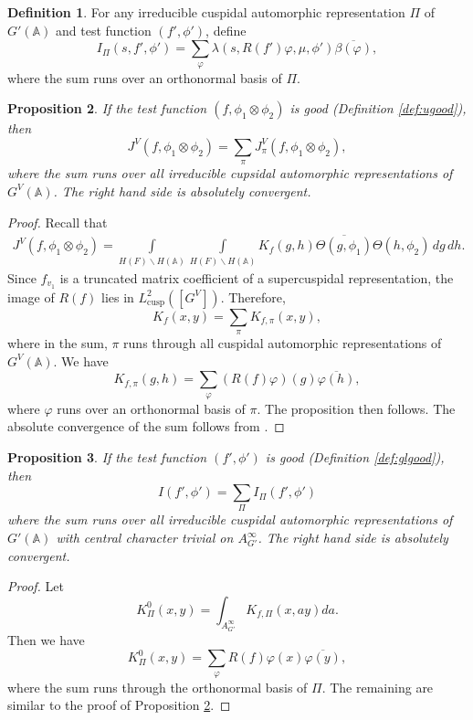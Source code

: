 \documentclass[11pt, reqno]{amsart}
\numberwithin{equation}{subsection}
\theoremstyle{plain}
\newtheorem{proposition}{Proposition}[subsection]
\theoremstyle{definition}
\newtheorem{definition}[proposition]{Definition}
\newcommand{\bs}{\backslash}
\renewcommand{\AA}{\mathbb A}
\newcommand{\ol}{\overline}
\begin{document}
\begin{definition}
For any irreducible cuspidal automorphic representation $\Pi$ of $G'(\AA)$ and test function $(f', \phi')$, define
\[
    I_\Pi(s, f', \phi') = \sum_\varphi \lambda(s, R(f')\varphi, \mu, \phi')
    \ol{\beta(\varphi)},
\]
   where the sum runs over an orthonormal basis of $\Pi$. 
\end{definition}



\begin{proposition}
\label{prop:uspectral}
     If the test function $(f, \phi_1 \otimes \phi_2)$ is good (Definition \ref{def:ugood}), then 
    \[
        J^V(f , \phi_1 \otimes \phi_2)
        = \sum_\pi J^V_\pi(f, \phi_1 \otimes \phi_2),
    \]
    where the sum runs over all irreducible cupsidal automorphic 
    representations of $G^V(\AA)$.
    The right hand side is absolutely convergent.
    \end{proposition}
\begin{proof}
Recall that
\begin{align*}
    J^V(f, \phi_1 \otimes \phi_2)
    = \int\limits_{H(F)\bs H(\AA)}
    \int\limits_{H(F)\bs H(\AA)}
    K_{f}(g, h)
    \ol{\Theta(g, \phi_1)}
    \Theta(h, \phi_2)\,dg\,dh.
\end{align*}
Since $f_{v_1}$ is a truncated matrix coefficient of a supercuspidal representation, the image of $R(f)$ lies in $L^2_{\operatorname{cusp}}([G^V])$.
Therefore,
\[
    K_f(x,y) = \sum_{\pi} K_{f,\pi}(x,y),
\]
where in the sum, $\pi$ runs through all cuspidal automorphic representations of $G^V(\AA)$.
We have
\[
    K_{f, \pi}(g, h) =
    \sum_{\varphi}(R(f)\varphi)(g)
    \ol{\varphi(h)},
\]
where $\varphi$ runs over an orthonormal basis of $\pi$.
The proposition then follows.
The absolute convergence of the sum follows from
\cite[Proposition~A.1.2]{MR4332778}.
\end{proof}




\begin{proposition}
\label{prop:glspectral}
If the test function $(f', \phi')$ is good (Definition \ref{def:glgood}), then
\[
    I(f', \phi') = \sum_{\Pi} I_\Pi(f', \phi')
\]
where the sum runs over all irreducible cuspidal 
automorphic representations of $G'(\AA)$ with
central character trivial on $A_{G'}^\infty$.
The right hand side is absolutely convergent.
\end{proposition}
\begin{proof}
Let
\[
    K_{\Pi}^0(x,y) = \int_{A_{G'}^\infty} K_{f,\Pi}(x,ay) da.
\]
Then we have
\[
    K_{\Pi}^0(x,y) = \sum_{\varphi} R(f)\varphi(x) 
    \overline{\varphi(y)},
\]
where the sum runs through the orthonormal basis of $\Pi$. The remaining are similar to the proof of Proposition \ref{prop:uspectral}.
\end{proof}
\end{document}
